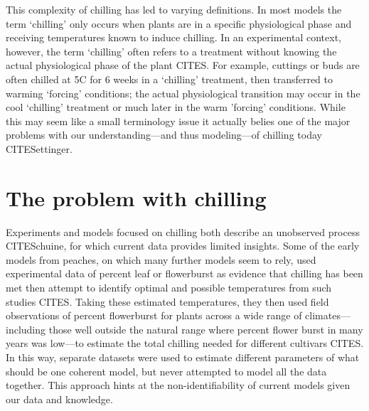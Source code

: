 \documentclass[11pt]{article}
\begin{document}
This complexity of chilling has led to varying definitions. In most models the term `chilling' only occurs when plants are in a specific physiological phase and receiving temperatures known to induce chilling. In an experimental context, however, the term `chilling' often refers to a treatment without knowing the actual physiological phase of the plant CITES. For example, cuttings or buds are often chilled at 5\degree C for 6 weeks in a `chilling' treatment, then transferred to warming `forcing' conditions; the actual physiological transition may occur in the cool `chilling' treatment or much later in the warm 'forcing' conditions. While this may seem like a small terminology issue it actually belies one of the major problems with our understanding---and thus modeling---of chilling today CITESettinger. 

\section*{The problem with chilling} 

Experiments and models focused on chilling both describe an unobserved process CITESchuine, for which current data provides limited insights. Some of the early models from peaches, on which many further models seem to rely, used experimental data of percent leaf or flowerburst as evidence that chilling has been met then attempt to identify optimal and possible temperatures from such studies CITES. Taking these estimated temperatures, they then used field observations of percent flowerburst for plants across a wide range of climates---including those well outside the natural range where percent flower burst in many years was low---to estimate the total chilling needed for different cultivars CITES. In this way, separate datasets were used to estimate different parameters of what should be one coherent model, but never attempted to model all the data together. This approach hints at the non-identifiability of current models given our data and knowledge. 

\end{document}
